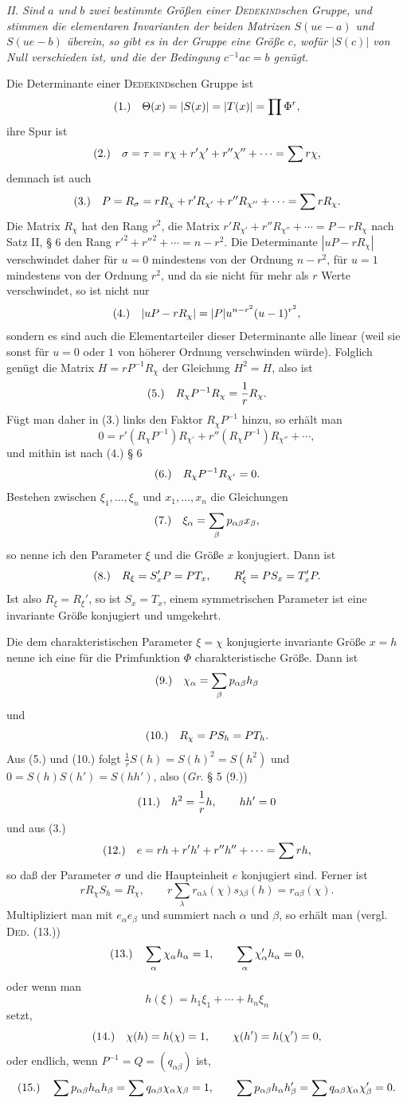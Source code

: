 \documentclass[11pt]{article}
\newcommand{\fnum}[1]{\textup{(\ensuremath{#1}.)}\quad}
\begin{document}
\emph{II. Sind $a$ und $b$ zwei bestimmte Größen einer \textsc{Dedekind}schen Gruppe, und stimmen die elementaren Invarianten der beiden Matrizen $S(ue-a)$ und $S(ue-b)$ überein, so gibt es in der Gruppe eine Größe $c$, wofür $|S(c)|$ von Null verschieden ist, und die der Bedingung $c^{-1}ac=b$ genügt.}

Die Determinante einer \textsc{Dedekind}schen Gruppe ist
\[
\fnum{1} \Theta(x)=|S(x)|=|T(x)|=\prod\Phi^r,
\]
ihre Spur ist
\[
\fnum{2} \sigma=\tau=r\chi+r'\chi'+r''\chi''+\cdots=\sum r\chi,
\]
demnach ist auch
\[
\fnum{3} P=R_\sigma=rR_\chi+r'R_{\chi'}+r''R_{\chi''}+\cdots=\sum rR_\chi.
\]
Die Matrix $R_\chi$ hat den Rang $r^2$, die Matrix $r'R_{\chi'}+r''R_{\chi''}+\cdots=P-rR_\chi$ nach Satz II, § 6 den Rang $r'^2+r''^2+\cdots=n-r^2$. Die Determinante $|uP-rR_\chi|$ verschwindet daher für $u=0$ mindestens von der Ordnung $n-r^2$, für $u=1$ mindestens von der Ordnung $r^2$, und da sie nicht für mehr als $r$ Werte verschwindet, so ist nicht nur
\[
\fnum{4} |uP-rR_\chi|=|P|u^{n-r^2}(u-1)^{r^2},
\]
sondern es sind auch die Elementarteiler dieser Determinante alle linear (weil sie sonst für $u=0$ oder $1$ von höherer Ordnung verschwinden würde). Folglich genügt die Matrix $H=rP^{-1}R_\chi$ der Gleichung $H^2=H$, also ist
\[
\fnum{5} R_\chi P^{-1}R_\chi=\frac1r R_\chi.
\]
Fügt man daher in (3.) links den Faktor $R_\chi P^{-1}$ hinzu, so erhält man
\[
 0=r'(R_\chi P^{-1})R_{\chi'}+r''(R_\chi P^{-1})R_{\chi''}+\cdots,
\]
und mithin ist nach (4.) § 6
\[
\fnum{6} R_\chi P^{-1}R_{\chi'}=0.
\]
Bestehen zwischen $\xi_1,\ldots,\xi_n$ und $x_1,\ldots,x_n$ die Gleichungen
\[
\fnum{7} \xi_\alpha=\sum_\beta p_{\alpha\beta}x_\beta,
\]
so nenne ich den Parameter $\xi$ und die Größe $x$ konjugiert. Dann ist
\[
\fnum{8} R_\xi=S_x'P=PT_x,
\qquad
R_\xi'=PS_x=T_x'P.
\]
Ist also $R_\xi=R_\xi'$, so ist $S_x=T_x$, einem symmetrischen Parameter ist eine invariante Größe konjugiert und umgekehrt.

Die dem charakteristischen Parameter $\xi=\chi$ konjugierte invariante Größe $x=h$ nenne ich eine für die Primfunktion $\Phi$ charakteristische Größe. Dann ist
\[
\fnum{9} \chi_\alpha=\sum_\beta p_{\alpha\beta}h_\beta
\]
und
\[
\fnum{10} R_\chi=PS_h=PT_h.
\]
Aus (5.) und (10.) folgt $\frac1r S(h)=S(h)^2=S(h^2)$ und $0=S(h)S(h')=S(hh')$, also (\emph{Gr.} § 5 (9.))
\[
\fnum{11} h^2=\frac1r h,
\qquad hh'=0
\]
und aus (3.)
\[
\fnum{12} e=rh+r'h'+r''h''+\cdots=\sum rh,
\]
so daß der Parameter $\sigma$ und die Haupteinheit $e$ konjugiert sind. Ferner ist
\[
 rR_\chi S_h=R_\chi,
 \qquad
 r\sum_\lambda r_{\alpha\lambda}(\chi)s_{\lambda\beta}(h)=r_{\alpha\beta}(\chi).
\]
Multipliziert man mit $e_\alpha e_\beta$ und summiert nach $\alpha$ und $\beta$, so erhält man (vergl. \textsc{Ded}. (13.))
\[
\fnum{13} \sum_\alpha \chi_\alpha h_\alpha=1,
\qquad
\sum_\alpha \chi'_{\alpha}h_\alpha=0,
\]
oder wenn man
\[
 h(\xi)=h_1\xi_1+\cdots+h_n\xi_n
\]
setzt,
\[
\fnum{14} \chi(h)=h(\chi)=1,
\qquad
\chi(h')=h(\chi')=0,
\]
oder endlich, wenn $P^{-1}=Q=(q_{\alpha\beta})$ ist,
\[
\fnum{15} \sum p_{\alpha\beta}h_\alpha h_\beta=\sum q_{\alpha\beta}\chi_\alpha\chi_\beta=1,
\qquad
\sum p_{\alpha\beta}h_\alpha h'_{\beta}=\sum q_{\alpha\beta}\chi_\alpha\chi'_{\beta}=0.
\]
\end{document}

